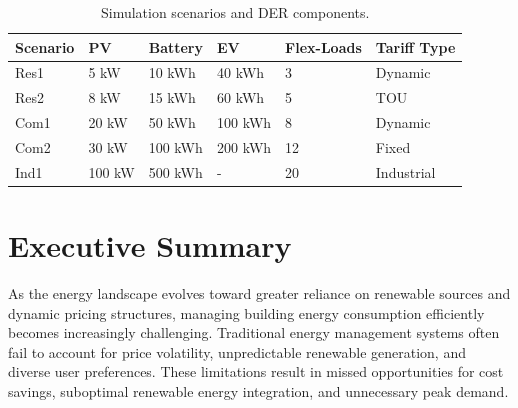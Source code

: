 \documentclass[12pt,a4paper]{article}
\begin{document}
\begin{abstract}
These gains are attained while respecting user-defined comfort constraints. Over 85–90\% of appliance operations remain within preferred time windows. Computational run-times are suitable for real-world use (on the order of seconds for day-ahead scheduling). The results highlight the potential of AI-driven, probabilistic energy management to lower costs for end-users, enhance renewable energy utilization, and provide demand flexibility for the grid. 

The agent-based approach proved crucial for modularity and resilience. The system can easily incorporate new device types or adapt to different markets (e.g., integrating real-time pricing or future grid services). In summary, the proposed EMS framework shows a viable path toward smarter, cost-effective, and user-centric energy management in buildings under dynamic pricing.
\end{abstract}

\newpage
\tableofcontents
\newpage

\begin{table}[H]
\centering
\caption{Simulation scenarios and DER components.}
\label{tab:v03-scenarios}
\begin{tabular}{llllll}
\toprule
Scenario & PV & Battery & EV & Flex-Loads & Tariff Type \\
\midrule
Res1 & 5 kW & 10 kWh & 40 kWh & 3 & Dynamic \\
Res2 & 8 kW & 15 kWh & 60 kWh & 5 & TOU \\
Com1 & 20 kW & 50 kWh & 100 kWh & 8 & Dynamic \\
Com2 & 30 kW & 100 kWh & 200 kWh & 12 & Fixed \\
Ind1 & 100 kW & 500 kWh & - & 20 & Industrial \\
\bottomrule
\end{tabular}
\end{table}

\section{Executive Summary}

\noindent 
As the energy landscape evolves toward greater reliance on renewable sources and dynamic pricing structures, managing building energy consumption efficiently becomes increasingly challenging. Traditional energy management systems often fail to account for price volatility, unpredictable renewable generation, and diverse user preferences. These limitations result in missed opportunities for cost savings, suboptimal renewable energy integration, and unnecessary peak demand.
\end{document}
